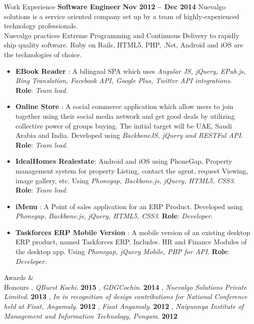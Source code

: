 \documentclass{resume}
\begin{document}
\begin{category}{Work Experience}
  \citemnobullet \textbf{Software Engineer} \hfill \textbf{Nov 2012 -- Dec 2014}
  \citemnobullet Nuevalgo solutions is a service oriented company set up by a team of highly-experienced technology professionals. \\Nuevalgo practices Extreme Programming and Continuous
  Delivery to rapidly ship quality software. Ruby on Rails, HTML5, PHP, .Net, Android and iOS are the technologies of choice.
  \begin{itemize}
  \item \textbf{EBook Reader} : A bilingual SPA which uses {\em Angular JS, jQuery, EPub.js, Bing Translation, Facebook API, Google Plus, Twitter API integrations}. \textbf{Role}: {\em Team lead}. 
  \item \textbf{Online Store} : A social commerce application which allow users to join together using their social media network and get good deals by utilizing collective power of groups buying. The initial target will be UAE, Saudi Arabia and India. Developed using {\em BackboneJS, jQuery and RESTFul API}. \textbf{Role}: {\em Team lead}.
  \item \textbf{IdealHomes Realestate}: Android and iOS using PhoneGap, Property management system for property Listing, contact the agent, request Viewing, image gallery, etc. Using {\em Phonegap, Backbone.js, jQuery, HTML5, CSS3}. \textbf{Role}: {\em Team lead}.
  \item \textbf{iMenu} : A Point of sales application for an ERP Product. Developed using {\em Phonegap, Backbone.js, jQuery, HTML5, CSS3}. \textbf{Role}: {\em Developer}.
  \item \textbf{Taskforces ERP Mobile Version} : A mobile version of an existing desktop ERP product, named Taskforces ERP. Includes. HR and Finance Modules of the desktop app. Using{\em
      Phonegap, jQuery Mobile, PHP for API}. \textbf{Role}: {\em Developer}. 
  \end{itemize}
\end{category}


\begin{category}{Awards \&\\ Honours}
  , {\em QBurst Kochi}. \hfill \textbf{2015}
  , {\em GDGCochin}. \hfill \textbf{2014}
  , {\em Nuevalgo Solutions Private Limited}. \hfill \textbf{2013}
  , {\em  In in recognition of design contributions for National Conference held at Fisat, Angamaly}. \hfill \textbf{2012}
  , {\em Fisat Angamaly}. \hfill \textbf{2012}
  , {\em  Naipunnya  Institute  of  Management  and  Information  Technology, Pongam}. \hfill \textbf{2012}
\end{category}
\end{document}
